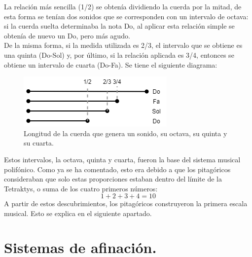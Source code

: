 \documentclass[a4paper, openright, 11pt, titlepage]{report}
\theoremstyle{definition}\newtheorem{defin}[propo]{Definition}
\theoremstyle{definition}\newtheorem{obser}[propo]{Remark}
\theoremstyle{definition}\newtheorem{ejem}[propo]{Ejemplo}
\theoremstyle{definition}\newtheorem{algoritmo}[propo]{Algoritmo}
\begin{document}
La relación más sencilla (1/2) se obtenía dividiendo la cuerda por la mitad, de esta forma se tenían dos sonidos que se corresponden con un intervalo de octava: si la cuerda suelta determinaba la nota Do, al aplicar esta relación simple se obtenía de nuevo un Do, pero más agudo.\\
De la misma forma, si la medida utilizada es 2/3, el intervalo que se obtiene es una quinta (Do-Sol) y, por último, si la relación aplicada es 3/4, entonces se obtiene un intervalo de cuarta (Do-Fa). Se tiene el siguiente diagrama:
\begin{figure}[H]
    \centering
    \includegraphics[scale = 0.7]{diagrama1.png}
    \caption{Longitud de la cuerda que genera un sonido, su octava, su quinta y su cuarta.}
\end{figure}
Estos intervalos, la octava, quinta y cuarta, fueron la base del sistema musical polifónico. Como ya se ha comentado, esto era debido a que los pitagóricos consideraban que solo estas proporciones estaban dentro del límite de la Tetraktys, o suma de los cuatro primeros números: $$1 + 2 + 3 + 4 = 10$$
A partir de estos descubrimientos, los pitagóricos construyeron la primera escala musical. Esto se explica en el siguiente apartado.
\chapter{Sistemas de afinación.}
\end{document}

